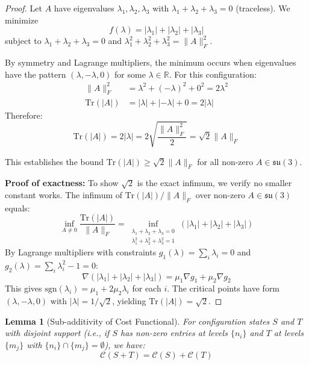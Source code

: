 \documentclass[11pt]{article}
\numberwithin{equation}{section}
\newtheorem{lemma}[theorem]{Lemma}
\theoremstyle{definition}
\theoremstyle{remark}
\begin{document}
\begin{proof}
Let $A$ have eigenvalues $\lambda_1, \lambda_2, \lambda_3$ with $\lambda_1 + \lambda_2 + \lambda_3 = 0$ (traceless). We minimize
\begin{equation}
f(\lambda) = |\lambda_1| + |\lambda_2| + |\lambda_3|
\end{equation}
subject to $\lambda_1 + \lambda_2 + \lambda_3 = 0$ and $\lambda_1^2 + \lambda_2^2 + \lambda_3^2 = \|A\|_F^2$.

By symmetry and Lagrange multipliers, the minimum occurs when eigenvalues have the pattern $(\lambda, -\lambda, 0)$ for some $\lambda \in \mathbb{R}$. For this configuration:
\begin{align}
\|A\|_F^2 &= \lambda^2 + (-\lambda)^2 + 0^2 = 2\lambda^2 \\
\text{Tr}(|A|) &= |\lambda| + |-\lambda| + 0 = 2|\lambda|
\end{align}
Therefore:
\begin{equation}
\text{Tr}(|A|) = 2|\lambda| = 2\sqrt{\frac{\|A\|_F^2}{2}} = \sqrt{2}\|A\|_F
\end{equation}

This establishes the bound $\text{Tr}(|A|) \geq \sqrt{2}\|A\|_F$ for all non-zero $A \in \mathfrak{su}(3)$.

\textbf{Proof of exactness:} To show $\sqrt{2}$ is the exact infimum, we verify no smaller constant works. The infimum of $\text{Tr}(|A|)/\|A\|_F$ over non-zero $A \in \mathfrak{su}(3)$ equals:
\begin{equation}
\inf_{A \neq 0} \frac{\text{Tr}(|A|)}{\|A\|_F} = \inf_{\substack{\lambda_1 + \lambda_2 + \lambda_3 = 0 \\ \lambda_1^2 + \lambda_2^2 + \lambda_3^2 = 1}} (|\lambda_1| + |\lambda_2| + |\lambda_3|)
\end{equation}
By Lagrange multipliers with constraints $g_1(\lambda) = \sum_i \lambda_i = 0$ and $g_2(\lambda) = \sum_i \lambda_i^2 - 1 = 0$:
\begin{equation}
\nabla(|\lambda_1| + |\lambda_2| + |\lambda_3|) = \mu_1 \nabla g_1 + \mu_2 \nabla g_2
\end{equation}
This gives $\text{sgn}(\lambda_i) = \mu_1 + 2\mu_2 \lambda_i$ for each $i$. The critical points have form $(\lambda, -\lambda, 0)$ with $|\lambda| = 1/\sqrt{2}$, yielding $\text{Tr}(|A|) = \sqrt{2}$.
\end{proof}

\begin{lemma}[Sub-additivity of Cost Functional]
\label{lem:sub-additivity}
For configuration states $S$ and $T$ with disjoint support (i.e., if $S$ has non-zero entries at levels $\{n_i\}$ and $T$ at levels $\{m_j\}$ with $\{n_i\} \cap \{m_j\} = \emptyset$), we have:
\begin{equation}
\mathcal{C}(S + T) = \mathcal{C}(S) + \mathcal{C}(T)
\end{equation}
\end{lemma}
\end{document}
